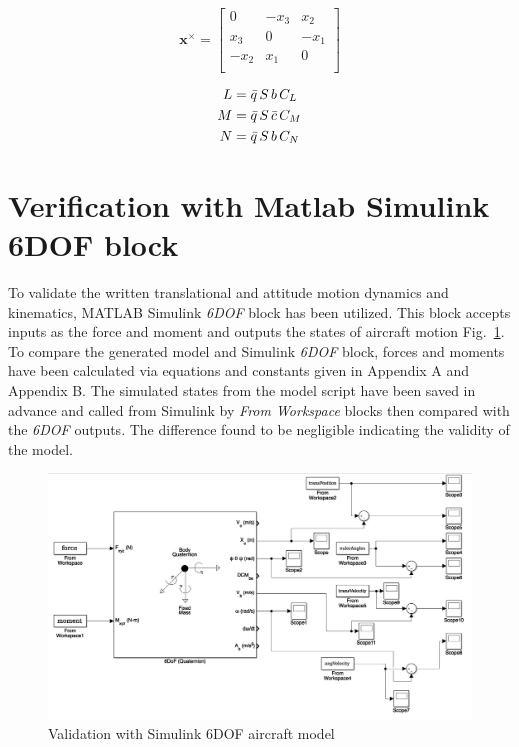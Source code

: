\begin{equation}
\bm{x} ^ \times= \begin{bmatrix} 
0 & -x_3 & x_2 \\
x_3 & 0 & -x_1 \\
-x_2 & x_1 & 0 \\
 \end{bmatrix}
\end{equation}


\begin{align}{\label{eqn:aeroMoments}}
\begin{split}
L& = \bar{q} \, S \, b \, C_L \\
M& = \bar{q} \, S \, \bar{c} \, C_M \\
N& = \bar{q} \, S \, b \, C_N \\
\end{split}
\end{align}

\section{Verification with Matlab Simulink 6DOF block}

To validate the written translational and attitude motion dynamics and kinematics, MATLAB Simulink \textit{6DOF} block has been utilized.
This block accepts inputs as the force and moment and outputs the states of aircraft motion Fig.~\ref{figure:validationSimulink}.
To compare the generated model and Simulink \textit{6DOF} block, forces and moments have been calculated via equations and constants given in Appendix A and Appendix B.
The simulated states from the model script have been saved in advance and called from Simulink by \textit{From Workspace} blocks then compared with the \textit{6DOF} outputs.
The difference found to be negligible indicating the validity of the model. 


\begin{figure}
\center
\includegraphics[width=1.1\columnwidth]{figures/validationViaSimulink}
\caption{Validation with Simulink 6DOF aircraft model}
\label{figure:validationSimulink}
\end{figure}


